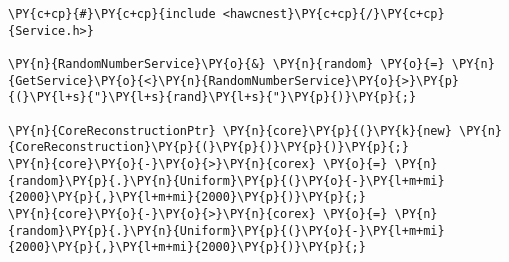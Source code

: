 \begin{Verbatim}[commandchars=\\\{\}]
\PY{c+cp}{#}\PY{c+cp}{include <hawcnest}\PY{c+cp}{/}\PY{c+cp}{Service.h>}

\PY{n}{RandomNumberService}\PY{o}{&} \PY{n}{random} \PY{o}{=} \PY{n}{GetService}\PY{o}{<}\PY{n}{RandomNumberService}\PY{o}{>}\PY{p}{(}\PY{l+s}{"}\PY{l+s}{rand}\PY{l+s}{"}\PY{p}{)}\PY{p}{;}

\PY{n}{CoreReconstructionPtr} \PY{n}{core}\PY{p}{(}\PY{k}{new} \PY{n}{CoreReconstruction}\PY{p}{(}\PY{p}{)}\PY{p}{)}\PY{p}{;}
\PY{n}{core}\PY{o}{-}\PY{o}{>}\PY{n}{corex} \PY{o}{=} \PY{n}{random}\PY{p}{.}\PY{n}{Uniform}\PY{p}{(}\PY{o}{-}\PY{l+m+mi}{2000}\PY{p}{,}\PY{l+m+mi}{2000}\PY{p}{)}\PY{p}{;}
\PY{n}{core}\PY{o}{-}\PY{o}{>}\PY{n}{corex} \PY{o}{=} \PY{n}{random}\PY{p}{.}\PY{n}{Uniform}\PY{p}{(}\PY{o}{-}\PY{l+m+mi}{2000}\PY{p}{,}\PY{l+m+mi}{2000}\PY{p}{)}\PY{p}{;}
\end{Verbatim}
